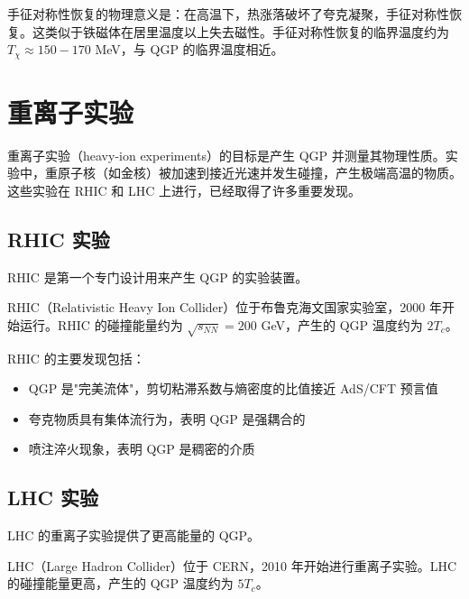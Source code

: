 \begin{remark}
手征对称性恢复的物理意义是：在高温下，热涨落破坏了夸克凝聚，手征对称性恢复。这类似于铁磁体在居里温度以上失去磁性。手征对称性恢复的临界温度约为 $T_\chi \approx 150-170$ MeV，与 QGP 的临界温度相近。
\end{remark}

\section{重离子实验}

重离子实验（heavy-ion experiments）的目标是产生 QGP 并测量其物理性质。实验中，重原子核（如金核）被加速到接近光速并发生碰撞，产生极端高温的物质。这些实验在 RHIC 和 LHC 上进行，已经取得了许多重要发现。

\subsection{RHIC 实验}

RHIC 是第一个专门设计用来产生 QGP 的实验装置。

\begin{definition}[RHIC]
RHIC（Relativistic Heavy Ion Collider）位于布鲁克海文国家实验室，2000 年开始运行。RHIC 的碰撞能量约为 $\sqrt{s_{NN}} = 200$ GeV，产生的 QGP 温度约为 $2T_c$。
\end{definition}

\begin{property}
RHIC 的主要发现包括：
\begin{itemize}
    \item QGP 是"完美流体"，剪切粘滞系数与熵密度的比值接近 AdS/CFT 预言值 \cite{Policastro2001,Kovtun2005}
    \item 夸克物质具有集体流行为，表明 QGP 是强耦合的
    \item 喷注淬火现象，表明 QGP 是稠密的介质
\end{itemize}
\end{property}

\subsection{LHC 实验}

LHC 的重离子实验提供了更高能量的 QGP。

\begin{definition}[LHC]
LHC（Large Hadron Collider）位于 CERN，2010 年开始进行重离子实验。LHC 的碰撞能量更高，产生的 QGP 温度约为 $5T_c$。
\end{definition}

